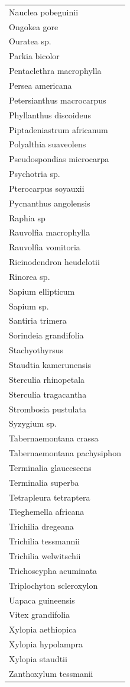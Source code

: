 \documentclass[
  12pt,
  a4paper,
  extrafontsizes,
  onecolumn,
  openright]{book}
\theoremstyle{definition}
\theoremstyle{definition}
\theoremstyle{definition}
\theoremstyle{definition}
\theoremstyle{remark}
\begin{document}
\begin{longtable}[]{@{}l@{}}
Nauclea pobeguinii \\
Ongokea gore \\
Ouratea sp. \\
Parkia bicolor \\
Pentaclethra macrophylla \\
Persea americana \\
Petersianthus macrocarpus \\
Phyllanthus discoideus \\
Piptadeniastrum africanum \\
Polyalthia suaveolens \\
Pseudospondias microcarpa \\
Psychotria sp. \\
Pterocarpus soyauxii \\
Pycnanthus angolensis \\
Raphia sp \\
Rauvolfia macrophylla \\
Rauvolfia vomitoria \\
Ricinodendron heudelotii \\
Rinorea sp. \\
Sapium ellipticum \\
Sapium sp. \\
Santiria trimera \\
Sorindeia grandifolia \\
Stachyothyrsus \\
Staudtia kamerunensis \\
Sterculia rhinopetala \\
Sterculia tragacantha \\
Strombosia pustulata \\
Syzygium sp. \\
Tabernaemontana crassa \\
Tabernaemontana pachysiphon \\
Terminalia glaucescens \\
Terminalia superba \\
Tetrapleura tetraptera \\
Tieghemella africana \\
Trichilia dregeana \\
Trichilia tessmannii \\
Trichilia welwitschii \\
Trichoscypha acuminata \\
Triplochyton scleroxylon \\
Uapaca guineensis \\
Vitex grandifolia \\
Xylopia aethiopica \\
Xylopia hypolampra \\
Xylopia staudtii \\
Zanthoxylum tessmanii \\
\bottomrule()
\end{longtable}
\end{document}
